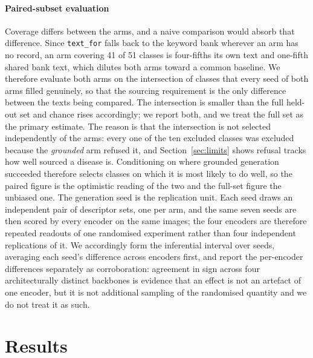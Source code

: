 \documentclass[a4paper,fleqn]{cas-dc}
\begin{document}
\paragraph{Paired-subset evaluation} Coverage differs between the arms, and a naive comparison would
absorb that difference. Since \texttt{text\_for} falls back to the keyword bank wherever an arm has
no record, an arm covering 41 of 51 classes is four-fifths its own text and one-fifth shared bank
text, which dilutes both arms toward a common baseline. We therefore evaluate both arms on the intersection of classes that every seed of both arms filled genuinely, so that the sourcing requirement is the only difference between the texts being compared. The intersection is smaller than the full held-out set and chance rises accordingly; we report both, and we treat the full set as the primary estimate. The reason is that the intersection is not selected independently of the arms: every one of the ten excluded classes was excluded because the \emph{grounded} arm refused it, and Section~\ref{sec:limits} shows refusal tracks how well sourced a disease is. Conditioning on where grounded generation succeeded therefore selects classes on which it is most likely to do well, so the paired figure is the optimistic reading of the two and the full-set figure the unbiased one. %
The generation seed is the replication unit. Each seed draws an independent pair of
descriptor sets, one per arm, and the same seven seeds are then scored by every encoder on
the same images; the four encoders are therefore repeated readouts of one randomised
experiment rather than four independent replications of it. We accordingly form the
inferential interval over seeds, averaging each seed's difference across encoders first, and
report the per-encoder differences separately as corroboration: agreement in sign across
four architecturally distinct backbones is evidence that an effect is not an artefact of one
encoder, but it is not additional sampling of the randomised quantity and we do not treat it
as such.

\section{Results}
\end{document}
